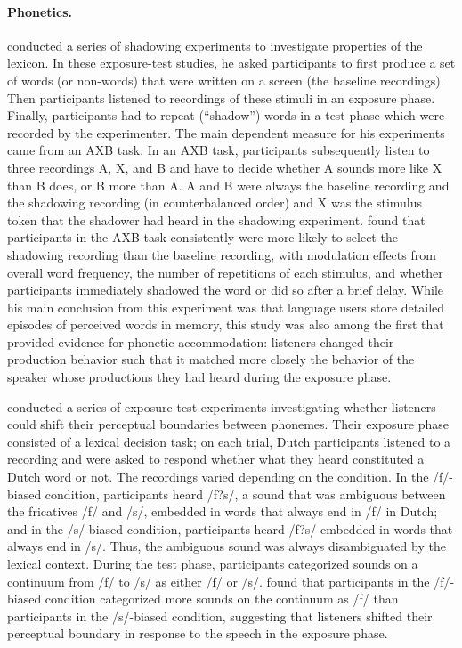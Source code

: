 \paragraph{Phonetics.} \cite{Goldinger1998} conducted a series of shadowing experiments to investigate properties of the lexicon. In these exposure-test studies, 
he asked participants to first produce a set of words (or non-words) that were written on a screen (the baseline recordings). Then participants listened to recordings of these stimuli in 
an exposure phase. Finally, participants had to repeat (``shadow'') words in a test phase which were recorded by the experimenter. The main dependent measure
for his experiments came from an AXB task. In an AXB task, participants subsequently listen to three recordings A, X, and B and have to decide whether A sounds more like X
than B does, or B more than A. A and B were always the baseline recording and the shadowing recording (in counterbalanced order) and X was the stimulus token that the shadower had heard
in the shadowing experiment. \cite{Goldinger1998} found that participants in the AXB task consistently were more likely to select the shadowing recording than the baseline recording, with modulation
effects from overall word frequency, the number of repetitions of each stimulus, and whether participants immediately shadowed the word or did so after a brief delay. While his main conclusion
from this experiment was that language users store detailed episodes of perceived words in memory, this study was also among the first that provided evidence for phonetic accommodation: 
listeners changed their production behavior such that it matched more closely the behavior of the speaker whose productions they had heard during the exposure phase.

\cite{Norris2003} conducted a series of exposure-test 
experiments investigating whether listeners could shift their perceptual boundaries between phonemes. Their exposure phase
consisted of a lexical decision task; on each trial, Dutch participants listened to a recording and were asked to respond whether
what they heard constituted a Dutch word or not. The recordings varied depending on the condition. In the /f/-biased condition,
participants heard /f?s/, a sound that was ambiguous between the fricatives /f/ and /s/, embedded in words that always end in /f/
in Dutch; and in the /s/-biased condition, participants heard /f?s/ embedded in words that always end in /s/. Thus, the ambiguous sound was always 
disambiguated by the lexical context. During the test phase, participants categorized sounds on a continuum from /f/ to /s/ as either /f/ or /s/. \cite{Norris2003}
found that participants in the /f/-biased condition categorized more sounds on the continuum as /f/ than participants in the /s/-biased condition,
suggesting that listeners shifted their perceptual boundary in response to the speech in the exposure phase.
 
